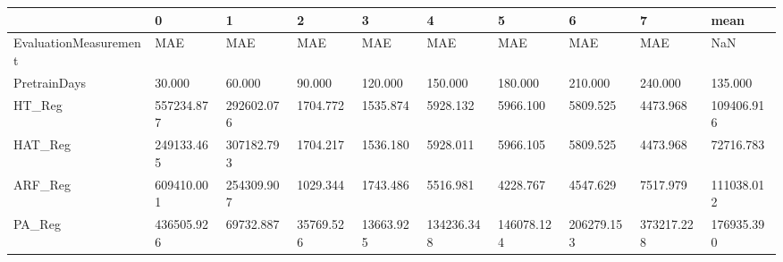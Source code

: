 \begin{tabular}{llllllllll}
\toprule
{} &          0 &          1 &         2 &         3 &          4 &          5 &          6 &          7 &       mean \\
\midrule
EvaluationMeasurement &        MAE &        MAE &       MAE &       MAE &        MAE &        MAE &        MAE &        MAE &        NaN \\
PretrainDays          &     30.000 &     60.000 &    90.000 &   120.000 &    150.000 &    180.000 &    210.000 &    240.000 &    135.000 \\
HT\_Reg                & 557234.877 & 292602.076 &  1704.772 &  1535.874 &   5928.132 &   5966.100 &   5809.525 &   4473.968 & 109406.916 \\
HAT\_Reg               & 249133.465 & 307182.793 &  1704.217 &  1536.180 &   5928.011 &   5966.105 &   5809.525 &   4473.968 &  72716.783 \\
ARF\_Reg               & 609410.001 & 254309.907 &  1029.344 &  1743.486 &   5516.981 &   4228.767 &   4547.629 &   7517.979 & 111038.012 \\
PA\_Reg                & 436505.926 &  69732.887 & 35769.526 & 13663.925 & 134236.348 & 146078.124 & 206279.153 & 373217.228 & 176935.390 \\
\bottomrule
\end{tabular}
